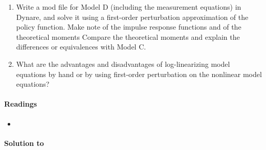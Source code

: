 \begin{enumerate}
\item Write a mod file for Model D (including the measurement equations) in Dynare,
  and solve it using a first-order perturbation approximation of the policy function.
Make note of the impulse response functions and of the theoretical moments
Compare the theoretical moments and explain the differences or equivalences with Model C.
  
\item What are the advantages and disadvantages of log-linearizing model equations by hand
  or by using first-order perturbation on the nonlinear model equations?
  
\end{enumerate}

\paragraph{Readings}
\begin{itemize}
	\item \textcite{An.Schorfheide_2007_BayesianAnalysisDSGE}
\end{itemize}

\begin{solution}\textbf{Solution to }
\ifDisplaySolutions%

\fi
\newpage
\end{solution}